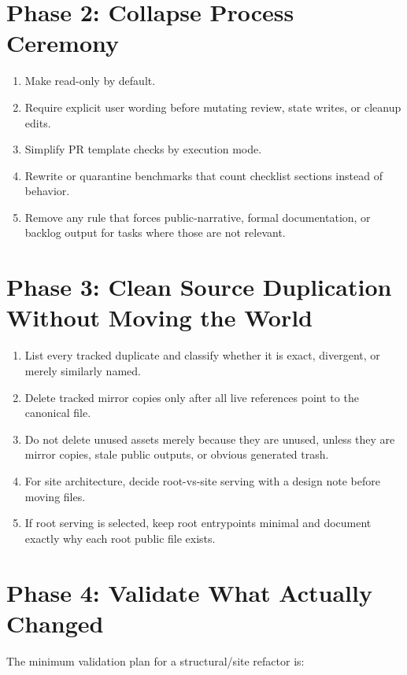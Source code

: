 \documentclass[a4paper,11pt,openany]{report}
\begin{document}
\section{Phase 2: Collapse Process Ceremony}

\begin{enumerate}
  \item Make  read-only by default.
  \item Require explicit user wording before mutating review, state writes, or
    cleanup edits.
  \item Simplify PR template checks by execution mode.
  \item Rewrite or quarantine benchmarks that count checklist sections instead
    of behavior.
  \item Remove any rule that forces public-narrative, formal documentation, or
    backlog output for tasks where those are not relevant.
\end{enumerate}

\section{Phase 3: Clean Source Duplication Without Moving the World}

\begin{enumerate}
  \item List every tracked duplicate and classify whether it is exact,
    divergent, or merely similarly named.
  \item Delete tracked mirror copies only after all live references point to the
    canonical file.
  \item Do not delete unused assets merely because they are unused, unless they
    are mirror copies, stale public outputs, or obvious generated trash.
  \item For site architecture, decide root-vs-site serving with a design note
    before moving files.
  \item If root serving is selected, keep root entrypoints minimal and document
    exactly why each root public file exists.
\end{enumerate}

\section{Phase 4: Validate What Actually Changed}

The minimum validation plan for a structural/site refactor is:
\end{document}
